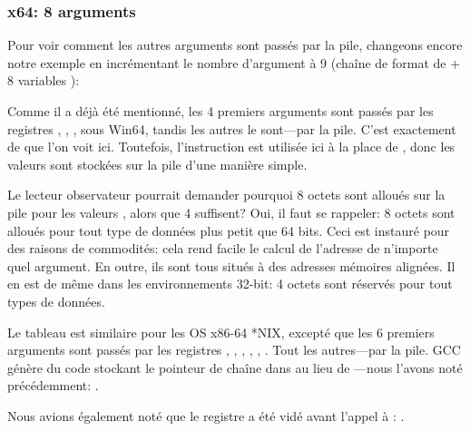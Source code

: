 \subsubsection{x64: 8 arguments}

\label{example_printf8_x64}
Pour voir comment les autres arguments sont passés par la pile, changeons encore
notre exemple en incrémentant le nombre d'argument à 9 (chaîne de format de
\printf + 8 variables \Tint):




Comme il a déjà été mentionné, les 4 premiers arguments sont passés par les registres
\RCX, \RDX, ,  sous Win64, tandis les autres le sont---par la pile.
C'est exactement de que l'on voit ici.
Toutefois, l'instruction \MOV est utilisée ici à la place de \PUSH, donc les valeurs
sont stockées sur la pile d'une manière simple.



Le lecteur observateur pourrait demander pourquoi 8 octets sont alloués sur la
pile pour les valeurs \Tint, alors que 4 suffisent?
Oui, il faut se rappeler: 8 octets sont alloués pour tout type de données plus
petit que 64 bits.
Ceci est instauré pour des raisons de commodités: cela rend facile le calcul
de l'adresse de n'importe quel argument.
En outre, ils sont tous situés à des adresses mémoires alignées.
Il en est de même dans les environnements 32-bit: 4 octets sont réservés pour tout
types de données.



Le tableau est similaire pour les OS x86-64 *NIX, excepté que les 6 premiers arguments
sont passés par les registres \RDI, \RSI, \RDX, \RCX, , .
Tout les autres---par la pile.
GCC génère du code stockant le pointeur de chaîne dans \EDI au lieu de \RDI{}---nous
l'avons noté précédemment:
.

Nous avions également noté que le registre \EAX a été vidé avant l'appel à
\printf: .




